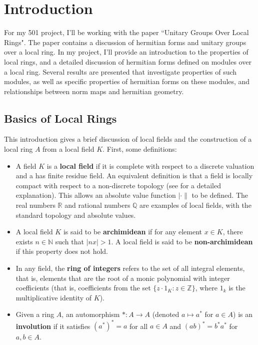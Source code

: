 \section{Introduction}

For my 501 project, I'll be working with the paper ``Unitary Groups Over Local Rings"\cite{cruickshank}.
The paper contains a discussion of hermitian forms and unitary groups over a local ring.
In my project, I'll provide an introduction to the properties of local rings, and a detailed discussion of hermitian forms
defined on modules over a local ring.
Several results are presented that investigate properties of such modules, as well as specific properties of hermitian forms on these modules,
and relationships between norm maps and hermitian geometry.

\subsection{Basics of Local Rings}

This introduction gives a brief discussion of local fields and the construction of a local ring $A$ from a local field $K$.
First, some definitions:

\begin{itemize}
\item A field $K$ is a \textbf{local field} if it is complete with respect to a discrete valuation and a has finite residue field.
An equivalent definition is that a field is locally compact with respect to a non-discrete topology (see \cite{serre} for a detailed explanation).
This allows an absolute value function $|\cdot\|$ to be defined.
The real numbers $\mathbb{R}$ and rational numbers $\mathbb{Q}$ are examples of local fields, with the standard topology and absolute values.

\item A local field $K$ is said to be \textbf{archimidean} if for any element $x \in K$, there exists $n \in \mathbb{N}$ such that $|nx| > 1$.
A local field is said to be \textbf{non-archimidean} if this property does not hold.

\item In any field, the \textbf{ring of integers} refers to the set of all integral elements, that is, 
elements that are the root of a monic polynomial with integer coefficients 
(that is, coefficients from the set $\{z \cdot 1_K : z \in \mathbb{Z} \}$, where $1_k$ is the multiplicative identity of $K$).

\item Given a ring $A$, an automorphism $*: A \to A$ (denoted $a \mapsto a^*$ for $a \in A$) is an \textbf{involution} 
if it satisfies $(a^*)^* = a$ for all $a \in A$ and $(ab)^* = b^* a^*$ for $a, b \in A$.
\end{itemize}

